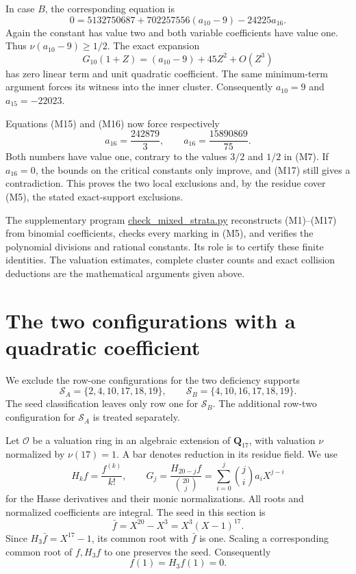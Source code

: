 \documentclass[
  british,
  10pt,
  a4paper,
]{article}
\begin{document}
In case \(B\), the corresponding equation is \[
0=5132750687+702257556(a_{10}-9)-24225a_{16}.                   \tag{M16}
\] Again the constant has value two and both variable coefficients have
value one. Thus \(\nu(a_{10}-9)\geq1/2\). The exact expansion \[
G_{10}(1+Z)=(a_{10}-9)+45Z^2+O(Z^3)
\] has zero linear term and unit quadratic coefficient. The same
minimum-term argument forces its witness into the inner cluster.
Consequently \(a_{10}=9\) and \(a_{15}=-22023\).

Equations (M15) and (M16) now force respectively \[
a_{16}=\frac{242879}{3},\qquad
a_{16}=\frac{15890869}{75}.                                   \tag{M17}
\] Both numbers have value one, contrary to the values \(3/2\) and
\(1/2\) in (M7). If \(a_{16}=0\), the bounds on the critical constants
only improve, and (M17) still gives a contradiction. This proves the two
local exclusions and, by the residue cover (M5), the stated
exact-support exclusions.

The supplementary program
\href{research/next-stage/last-four/middle/check_mixed_strata.py}{check\_mixed\_strata.py}
reconstructs (M1)--(M17) from binomial coefficients, checks every
marking in (M5), and verifies the polynomial divisions and rational
constants. Its role is to certify these finite identities. The valuation
estimates, complete cluster counts and exact collision deductions are
the mathematical arguments given above.

\section{The two configurations with a quadratic
coefficient}\label{the-two-configurations-with-a-quadratic-coefficient}

We exclude the row-one configurations for the two deficiency supports \[
\mathcal S_A=\{2,4,10,17,18,19\},\qquad
\mathcal S_B=\{4,10,16,17,18,19\}.
\] The seed classification leaves only row one for \(\mathcal S_B\). The
additional row-two configuration for \(\mathcal S_A\) is treated
separately.

Let \(\mathcal O\) be a valuation ring in an algebraic extension of
\(\mathbf Q_{17}\), with valuation \(\nu\) normalized by \(\nu(17)=1\).
A bar denotes reduction in its residue field. We use \[
H_kf=\frac{f^{(k)}}{k!},\qquad
G_j=\frac{H_{20-j}f}{\binom{20}{j}}
   =\sum_{i=0}^{j}\binom ji a_iX^{j-i}
\] for the Hasse derivatives and their monic normalizations. All roots
and normalized coefficients are integral. The seed in this section is \[
\bar f=X^{20}-X^3=X^3(X-1)^{17}.
\] Since \(H_3\bar f=X^{17}-1\), its common root with \(\bar f\) is one.
Scaling a corresponding common root of \(f,H_3f\) to one preserves the
seed. Consequently \[
f(1)=H_3f(1)=0.
\]
\end{document}
